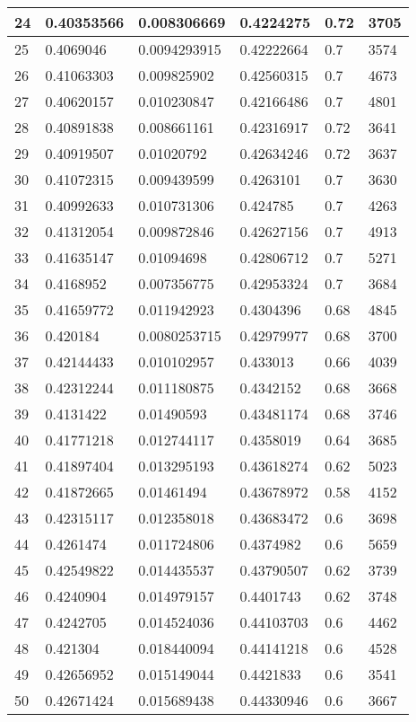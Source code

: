 \begin{longtable}{|l|l|l|l|l|l|}
24 & 0.40353566 & 0.008306669 & 0.4224275 & 0.72 & 3705 \\ \hline 
25 & 0.4069046 & 0.0094293915 & 0.42222664 & 0.7 & 3574 \\ \hline 
26 & 0.41063303 & 0.009825902 & 0.42560315 & 0.7 & 4673 \\ \hline 
27 & 0.40620157 & 0.010230847 & 0.42166486 & 0.7 & 4801 \\ \hline 
28 & 0.40891838 & 0.008661161 & 0.42316917 & 0.72 & 3641 \\ \hline 
29 & 0.40919507 & 0.01020792 & 0.42634246 & 0.72 & 3637 \\ \hline 
30 & 0.41072315 & 0.009439599 & 0.4263101 & 0.7 & 3630 \\ \hline 
31 & 0.40992633 & 0.010731306 & 0.424785 & 0.7 & 4263 \\ \hline 
32 & 0.41312054 & 0.009872846 & 0.42627156 & 0.7 & 4913 \\ \hline 
33 & 0.41635147 & 0.01094698 & 0.42806712 & 0.7 & 5271 \\ \hline 
34 & 0.4168952 & 0.007356775 & 0.42953324 & 0.7 & 3684 \\ \hline 
35 & 0.41659772 & 0.011942923 & 0.4304396 & 0.68 & 4845 \\ \hline 
36 & 0.420184 & 0.0080253715 & 0.42979977 & 0.68 & 3700 \\ \hline 
37 & 0.42144433 & 0.010102957 & 0.433013 & 0.66 & 4039 \\ \hline 
38 & 0.42312244 & 0.011180875 & 0.4342152 & 0.68 & 3668 \\ \hline 
39 & 0.4131422 & 0.01490593 & 0.43481174 & 0.68 & 3746 \\ \hline 
40 & 0.41771218 & 0.012744117 & 0.4358019 & 0.64 & 3685 \\ \hline 
41 & 0.41897404 & 0.013295193 & 0.43618274 & 0.62 & 5023 \\ \hline 
42 & 0.41872665 & 0.01461494 & 0.43678972 & 0.58 & 4152 \\ \hline 
43 & 0.42315117 & 0.012358018 & 0.43683472 & 0.6 & 3698 \\ \hline 
44 & 0.4261474 & 0.011724806 & 0.4374982 & 0.6 & 5659 \\ \hline 
45 & 0.42549822 & 0.014435537 & 0.43790507 & 0.62 & 3739 \\ \hline 
46 & 0.4240904 & 0.014979157 & 0.4401743 & 0.62 & 3748 \\ \hline 
47 & 0.4242705 & 0.014524036 & 0.44103703 & 0.6 & 4462 \\ \hline 
48 & 0.421304 & 0.018440094 & 0.44141218 & 0.6 & 4528 \\ \hline 
49 & 0.42656952 & 0.015149044 & 0.4421833 & 0.6 & 3541 \\ \hline 
50 & 0.42671424 & 0.015689438 & 0.44330946 & 0.6 & 3667 \\ \hline 
\end{longtable}